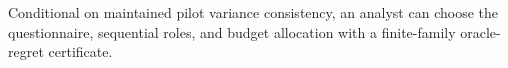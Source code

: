 Conditional on maintained pilot variance consistency, an analyst can choose the questionnaire, sequential roles, and budget allocation with a finite-family oracle-regret certificate.